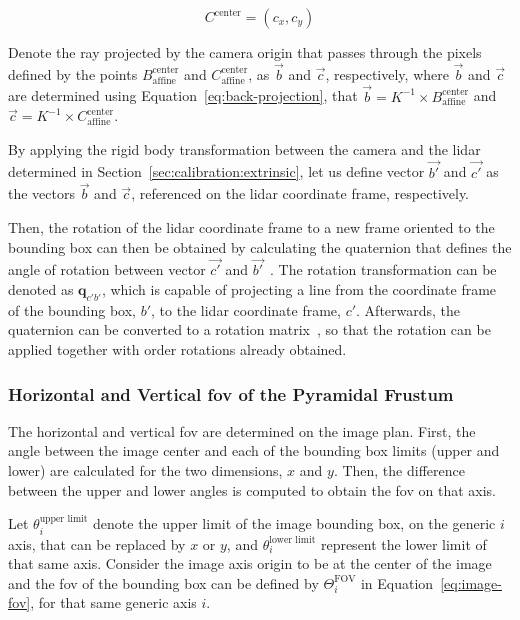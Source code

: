 \begin{equation}
\label{eq:image-pixel-center}
C^\text{center} = (c_x, c_y)
\end{equation}

Denote  the ray projected by the camera origin that passes through the pixels defined by the points $B^\text{center}_\text{affine}$ and $C^\text{center}_\text{affine}$, as $\vec{b}$ and $\vec{c}$, respectively, where $\vec{b}$ and $\vec{c}$ are determined using Equation~\eqref{eq:back-projection}, that $\vec{b} = K^{-1} \times B^\text{center}_\text{affine}$ and $\vec{c} = K^{-1} \times C^\text{center}_\text{affine}$.

By applying the rigid body transformation between the camera and the \ac{lidar} determined in Section~\ref{sec:calibration:extrinsic}, let us define vector $\vec{b'}$ and $\vec{c'}$ as the vectors $\vec{b}$ and $\vec{c}$, referenced on the \ac{lidar} coordinate frame, respectively.

Then, the rotation of the \ac{lidar} coordinate frame to a new frame oriented to the bounding box can then be obtained by calculating the quaternion that defines the angle of rotation between vector $\vec{c'}$ and $\vec{b'}$~\cite{mvg_book}. The rotation transformation can be denoted as $\mathbf{q}_{c'b'}$, which is capable of projecting a line from the coordinate frame of the bounding box, $b'$, to the \ac{lidar} coordinate frame, $c'$. Afterwards, the quaternion can be converted to a rotation matrix~\cite{Dai2015, mvg_book}, so that the rotation can be applied together with order rotations already obtained.

\subsubsection{Horizontal and Vertical \acs{fov} of the Pyramidal Frustum}
The horizontal and vertical \ac{fov} are determined on the image plan. First, the angle between the image center and each of the bounding box limits (upper and lower) are calculated for the two dimensions, $x$ and $y$. Then, the difference between the upper and lower angles is computed to obtain the \ac{fov} on that axis.

Let $\theta^\text{upper limit}_i$ denote the upper limit of the image bounding box, on the generic $i$ axis, that can be replaced by $x$ or $y$, and $\theta^\text{lower limit}_i$ represent the lower limit of that same axis. Consider the image axis origin to be at the center of the image and the \ac{fov} of the bounding box can be defined by $\Theta^\text{FOV}_i$ in Equation~\eqref{eq:image-fov}, for that same generic axis $i$.

